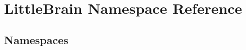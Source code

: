 \hypertarget{namespace_little_brain}{}\section{Little\+Brain Namespace Reference}
\label{namespace_little_brain}
\subsection*{Namespaces}
\begin{DoxyCompactItemize}
\end{DoxyCompactItemize}
